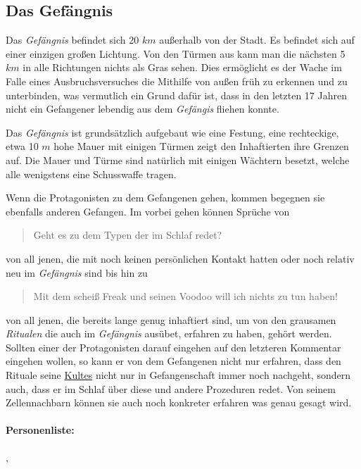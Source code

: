 \subsection{Das Gefängnis}
    \label{loc:gefaengnis}
    Das \emph{Gefängnis} befindet sich 20 $km$ außerhalb von der Stadt. Es befindet sich auf einer einzigen großen Lichtung. Von den Türmen aus kann man die nächsten 5 $km$ in alle Richtungen nichts als Gras sehen. Dies ermöglicht es der Wache im Falle eines Ausbruchsversuches die Mithilfe von außen früh zu erkennen und zu unterbinden, was vermutlich ein Grund dafür ist, dass in den letzten 17 Jahren nicht ein Gefangener lebendig aus dem \emph{Gefängis} fliehen konnte.

    Das \emph{Gefängnis} ist grundsätzlich aufgebaut wie eine Festung, eine rechteckige, etwa 10 $m$ hohe Mauer mit einigen Türmen zeigt den Inhaftierten ihre Grenzen auf. Die Mauer und Türme sind natürlich mit einigen Wächtern besetzt, welche alle wenigstens eine Schusswaffe tragen.

    Wenn die Protagonisten zu dem Gefangenen  gehen, kommen begegnen sie ebenfalls anderen Gefangen. Im vorbei gehen können Sprüche von
    \begin{quote}
        Geht es zu dem Typen der im Schlaf redet?
    \end{quote}
    von all jenen, die mit  noch keinen persönlichen Kontakt hatten oder noch relativ neu im \emph{Gefängnis} sind bis hin zu
    \begin{quote}
        Mit dem scheiß Freak und seinen Voodoo will ich nichts zu tun haben!
    \end{quote}
    von all jenen, die bereits lange genug inhaftiert sind, um von den grausamen \emph{Ritualen} die  auch im \emph{Gefängnis} ausübet, erfahren zu haben, gehört werden. Sollten einer der Protagonisten darauf eingehen auf den letzteren Kommentar eingehen wollen, so kann er von dem Gefangenen nicht nur erfahren, dass  den Rituale seine \hyperref[sons:kult-von-colthubor]{Kultes} nicht nur in Gefangenschaft immer noch nachgeht, sondern auch, dass er im Schlaf über diese und andere Prozeduren redet. Von seinem Zellennachbarn  können sie auch noch konkreter erfahren was genau gesagt wird.


    \paragraph{Personenliste:} , 
